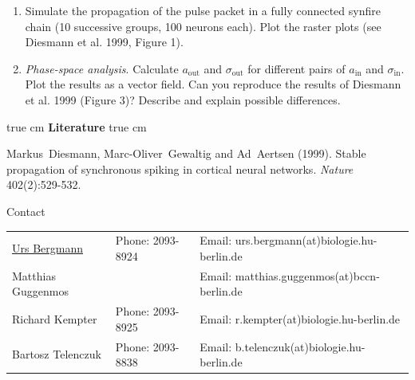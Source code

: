 \documentclass[12pt]{article}
\begin{document}
\begin{enumerate}
    \item Simulate the propagation of the pulse packet in a fully
        connected synfire chain (10 successive groups, 100 neurons
        each). Plot the raster plots (see Diesmann et al. 1999, Figure
        1).

    \item \textit{Phase-space analysis}. Calculate $a_\mathrm{out}$
        and $\sigma_\mathrm{out}$ for different pairs of
        $a_\mathrm{in}$ and  $\sigma_\mathrm{in}$. Plot the results as
        a vector field. Can you reproduce the results of Diesmann et
        al. 1999 (Figure 3)? Describe and explain possible differences.

\end{enumerate}

 true cm
{\bf Literature} 
 true cm

Markus~Diesmann, Marc-Oliver~Gewaltig and Ad~Aertsen (1999). Stable propagation
of
synchronous spiking in cortical neural networks.
\emph{Nature} 402(2):529-532.\newline

\vfill
\centerline{\CAP Contact}
\CAP

\begin{tabular}{lll}
\underline{Urs Bergmann} & Phone: 2093-8924 & Email:
urs.bergmann(at)biologie.hu-berlin.de \\
Matthias Guggenmos & & Email: matthias.guggenmos(at)bccn-berlin.de \\
Richard Kempter \hfill & Phone: 2093-8925 \hfill & Email:
r.kempter(at)biologie.hu-berlin.de \\
Bartosz Telenczuk & Phone: 2093-8838 & Email:
b.telenczuk(at)biologie.hu-berlin.de \\
\end{tabular}
\end{document}
